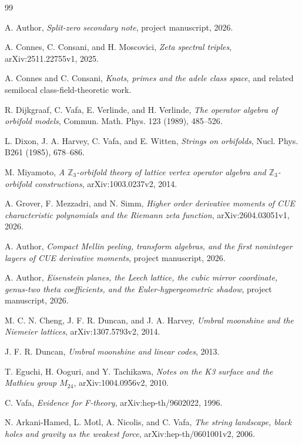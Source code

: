 \documentclass[11pt]{article}
\newcommand{\ZZ}{\mathbb Z}
\begin{document}
\begin{thebibliography}{99}

A. Author, \emph{Split-zero secondary note}, project manuscript, 2026.

A. Connes, C. Consani, and H. Moscovici, \emph{Zeta spectral triples}, arXiv:2511.22755v1, 2025.

A. Connes and C. Consani, \emph{Knots, primes and the adele class space}, and related semilocal class-field-theoretic work.

R. Dijkgraaf, C. Vafa, E. Verlinde, and H. Verlinde, \emph{The operator algebra of orbifold models}, Commun. Math. Phys. 123 (1989), 485--526.

L. Dixon, J. A. Harvey, C. Vafa, and E. Witten, \emph{Strings on orbifolds}, Nucl. Phys. B261 (1985), 678--686.

M. Miyamoto, \emph{A $\ZZ_3$-orbifold theory of lattice vertex operator algebra and $\ZZ_3$-orbifold constructions}, arXiv:1003.0237v2, 2014.

A. Grover, F. Mezzadri, and N. Simm, \emph{Higher order derivative moments of CUE characteristic polynomials and the Riemann zeta function}, arXiv:2604.03051v1, 2026.

A. Author, \emph{Compact Mellin peeling, transform algebras, and the first noninteger layers of CUE derivative moments}, project manuscript, 2026.

A. Author, \emph{Eisenstein planes, the Leech lattice, the cubic mirror coordinate, genus-two theta coefficients, and the Euler-hypergeometric shadow}, project manuscript, 2026.

M. C. N. Cheng, J. F. R. Duncan, and J. A. Harvey, \emph{Umbral moonshine and the Niemeier lattices}, arXiv:1307.5793v2, 2014.

J. F. R. Duncan, \emph{Umbral moonshine and linear codes}, 2013.

T. Eguchi, H. Ooguri, and Y. Tachikawa, \emph{Notes on the K3 surface and the Mathieu group $M_{24}$}, arXiv:1004.0956v2, 2010.

C. Vafa, \emph{Evidence for F-theory}, arXiv:hep-th/9602022, 1996.

N. Arkani-Hamed, L. Motl, A. Nicolis, and C. Vafa, \emph{The string landscape, black holes and gravity as the weakest force}, arXiv:hep-th/0601001v2, 2006.


\end{thebibliography}
\end{document}
